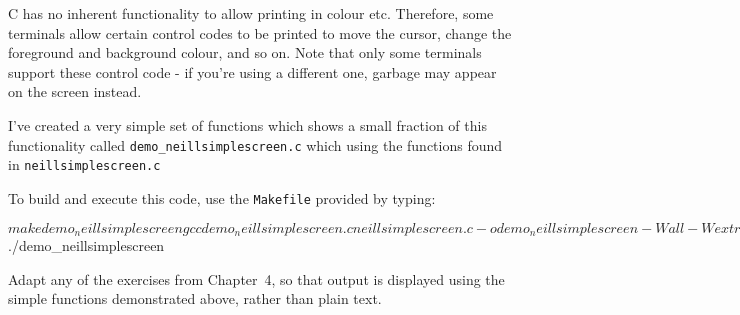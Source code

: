 C has no inherent functionality to allow printing in colour etc.
Therefore, some terminals allow certain control codes to be printed
to move the cursor, change the foreground and background colour, and
so on.
Note that only some terminals support these control code - if you're
using a different one, garbage may appear on the screen instead.

I've created a very simple set of functions which shows a small
fraction of this functionality called \verb^demo_neillsimplescreen.c^
which using the functions found in \verb^neillsimplescreen.c^

To build and execute this code, use the \verb^Makefile^ provided by typing:
\begin{terminaloutput}
$ make demo_neillsimplescreen
gcc demo_neillsimplescreen.c neillsimplescreen.c
-o demo_neillsimplescreen -Wall -Wextra -pedantic 
-std=c99 -Wvla -g3 -fsanitize=undefined -fsanitize=address -lm
$ ./demo_neillsimplescreen 
\end{terminaloutput}

\begin{exercise}
Adapt any of the exercises from Chapter~4, so that output is displayed
using the simple functions demonstrated above, rather than plain text.
\end{exercise}

